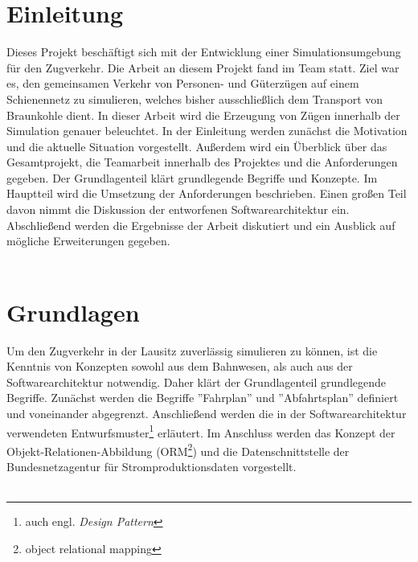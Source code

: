 \documentclass{scrbook} %
\begin{document}
	\ifisbook\fi
	\ifisbook\cleardoubleemptypage\fi

	
	\ifisbook\cleardoubleemptypage\fi
	\tableofcontents
	\cleardoublepage


	\chapter{Einleitung}
	Dieses Projekt beschäftigt sich mit der Entwicklung einer Simulationsumgebung für den Zugverkehr. Die Arbeit an diesem Projekt fand im Team statt. Ziel war es, den gemeinsamen Verkehr von Personen- und Güterzügen auf einem Schienennetz zu simulieren, welches bisher ausschließlich dem Transport von Braunkohle dient. In dieser Arbeit wird die Erzeugung von Zügen innerhalb der Simulation genauer beleuchtet. In der Einleitung werden zunächst die Motivation und die aktuelle Situation vorgestellt. Außerdem wird ein Überblick über das Gesamtprojekt, die Teamarbeit innerhalb des Projektes und die Anforderungen gegeben. Der Grundlagenteil klärt grundlegende Begriffe und Konzepte. Im Hauptteil wird die Umsetzung der Anforderungen beschrieben. Einen großen Teil davon nimmt die Diskussion der entworfenen Softwarearchitektur ein. Abschließend werden die Ergebnisse der Arbeit diskutiert und ein Ausblick auf mögliche Erweiterungen gegeben.\\
	\\
	
	
	
	
	

	\chapter{Grundlagen}
	Um den Zugverkehr in der Lausitz zuverlässig simulieren zu können, ist die Kenntnis von Konzepten sowohl aus dem Bahnwesen, als auch aus der Softwarearchitektur notwendig. Daher klärt der Grundlagenteil grundlegende Begriffe. Zunächst werden die Begriffe ''Fahrplan'' und ''Abfahrtsplan'' definiert und voneinander abgegrenzt. Anschließend werden die in der Softwarearchitektur verwendeten Entwurfsmuster\footnote{auch engl. \emph{Design Pattern}} erläutert. Im Anschluss werden das Konzept der Objekt-Relationen-Abbildung (ORM\footnote{object relational mapping}) und die Datenschnittstelle der Bundesnetzagentur für Stromproduktionsdaten vorgestellt.\\
	\\
	
	
	
	
	
\end{document}
